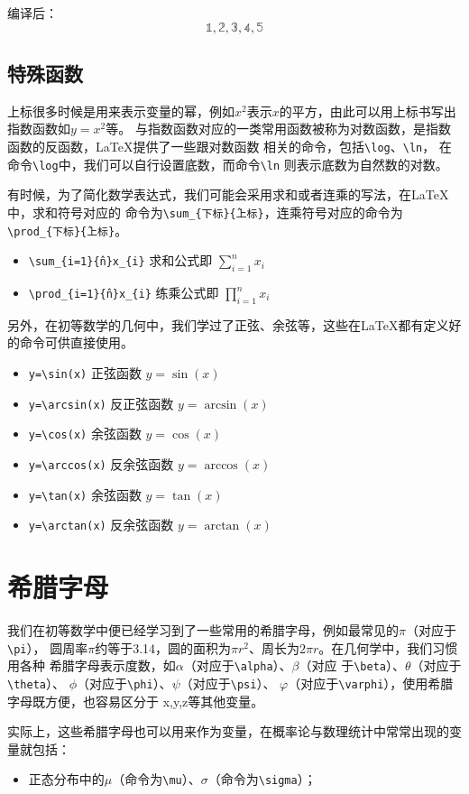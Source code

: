 编译后：
$$\mathbb{1},\mathbb{2},\mathbb{3},\mathbb{4},\mathbb{5}$$

\subsection{特殊函数}
上标很多时候是用来表示变量的幂，例如$x^{2}$表示$x$的平方，由此可以用上标书写出指数函数如$y=x^2$等。
与指数函数对应的一类常用函数被称为对数函数，是指数函数的反函数，LaTeX提供了一些跟对数函数
相关的命令，包括\texttt{\textbackslash{}log}、\texttt{\textbackslash{}ln}，
在命令\texttt{\textbackslash{}log}中，我们可以自行设置底数，而命令\texttt{\textbackslash{}ln}
则表示底数为自然数的对数。

有时候，为了简化数学表达式，我们可能会采用求和或者连乘的写法，在LaTeX中，求和符号对应的
命令为\texttt{\textbackslash{}sum\_\{下标\}\^\{上标\}}，连乘符号对应的命令为
\texttt{\textbackslash{}prod\_\{下标\}\^\{上标\}}。

\begin{itemize}
    \item \texttt{\textbackslash{}sum\_\{i=1\}\^\{n\}x\_\{i\}} 求和公式即 $\sum_{i=1}^{n}x_{i}$
    \item \texttt{\textbackslash{}prod\_\{i=1\}\^\{n\}x\_\{i\}} 练乘公式即 $\prod_{i=1}^{n}x_{i}$
\end{itemize}

另外，在初等数学的几何中，我们学过了正弦、余弦等，这些在LaTeX都有定义好的命令可供直接使用。

\begin{itemize}
    \item \texttt{y=\textbackslash{}sin(x)} 正弦函数 $y=\sin(x)$
    \item \texttt{y=\textbackslash{}arcsin(x)} 反正弦函数 $y=\arcsin(x)$
    \item \texttt{y=\textbackslash{}cos(x)} 余弦函数 $y=\cos(x)$
    \item \texttt{y=\textbackslash{}arccos(x)} 反余弦函数 $y=\arccos(x)$
    \item \texttt{y=\textbackslash{}tan(x)} 余弦函数 $y=\tan(x)$
    \item \texttt{y=\textbackslash{}arctan(x)} 反余弦函数 $y=\arctan(x)$
\end{itemize}

\section{希腊字母}
我们在初等数学中便已经学习到了一些常用的希腊字母，例如最常见的$\pi$（对应于\texttt{\textbackslash{}pi}），
圆周率$\pi$约等于3.14，圆的面积为$\pi r^2$、周长为$2\pi r$。在几何学中，我们习惯用各种
希腊字母表示度数，如$\alpha$（对应于\texttt{\textbackslash{}alpha}）、$\beta$（对应
于\texttt{\textbackslash{}beta}）、$\theta$（对应于\texttt{\textbackslash{}theta}）、
$\phi$（对应于\texttt{\textbackslash{}phi}）、$\psi$（对应于\texttt{\textbackslash{}psi}）、
$\varphi$（对应于\texttt{\textbackslash{}varphi}），使用希腊字母既方便，也容易区分于
x,y,z等其他变量。

实际上，这些希腊字母也可以用来作为变量，在概率论与数理统计中常常出现的变量就包括：
\begin{itemize}
    \item 正态分布中的$\mu$（命令为\texttt{\textbackslash{}mu}）、$\sigma$（命令为\texttt{\textbackslash{}sigma}）；
\end{itemize}